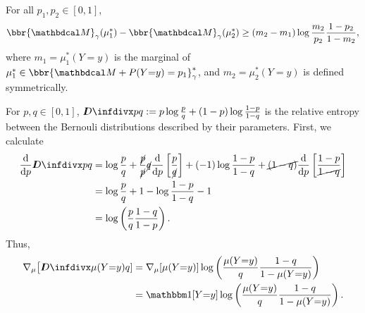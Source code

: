 \begin{lemma} \label{lem:score-gradient-bound}
    For all $p_1, p_2 \in [0,1]$,
    \[
        \bbr{\dg M}_\gamma(\mu_1^*) - \bbr{\dg M}_\gamma(\mu_2^*)
            \ge (m_2 - m_1) \log \frac{m_2}{p_2} \frac{1-p_2}{1-m_2},
    \]
    where
    $m_1 = \mu_1^*(Y{=}y)$ is the marginal of $\mu_1^* \in \bbr{\dg M + \Pr(Y{=}y) = p_1}^*_\gamma$,
    and $m_2 = \mu_2^*(Y{=}y)$ is defined symmetrically.
\end{lemma}
\begin{lproof}
    For $p, q \in [0,1]$, $\kldiv pq := p \log \frac{p}{q} + (1-p) \log \frac{1-p}{1-q}$ is the relative entropy between the Bernouli distributions described by their parameters.
    First, we calculate
    \begin{align*}
        \frac{\mathrm d}{\mathrm d p} \kldiv{p}{q}
        &= \log \frac{p}{q} + \frac{\Cancel{p}}{\Cancel{p}} \Cancel{q} \frac{\mathrm d}{\mathrm dp} \left[ \frac{p}{\Cancel{q}} \right]
        + (-1) \log \frac{1-p}{1-q} + \Cancel{(1-q)} \frac{\mathrm d}{\mathrm d p}\left[\frac{1-p}{\Cancel{1-q}}\right] \\
        &= \log \frac pq + 1 - \log \frac{1-p}{1-q} -1  \\
        &= \log \left( \frac{p}{q} \frac{1-q}{1-p} \right).
    \end{align*}
    Thus,
    \begin{align*}
        \nabla_\mu \big[ \kldiv {\mu(Y{=}y)}{q} ]
        &= \nabla_\mu[ \mu(Y{=}y) ] \log \left( \frac{\mu(Y{=}y)}{q} \frac{1-q}{1-\mu(Y{=}y)} \right) \\
        &= \mathbbm1[Y{=}y] \log \left( \frac{\mu(Y{=}y)}{q} \frac{1-q}{1-\mu(Y{=}y)} \right).
    \end{align*}


\end{lproof}

